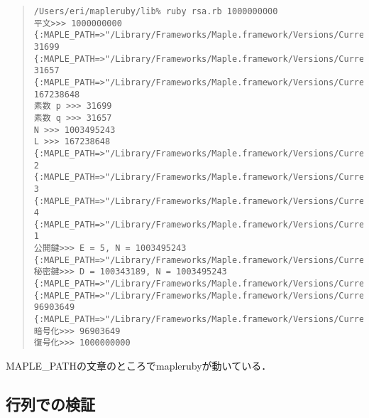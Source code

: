 \begin{quote}\begin{verbatim}
/Users/eri/mapleruby/lib% ruby rsa.rb 1000000000
平文>>> 1000000000
{:MAPLE_PATH=>"/Library/Frameworks/Maple.framework/Versions/Current/bin/maple"}
31699
{:MAPLE_PATH=>"/Library/Frameworks/Maple.framework/Versions/Current/bin/maple"}
31657
{:MAPLE_PATH=>"/Library/Frameworks/Maple.framework/Versions/Current/bin/maple"}
167238648
素数 p >>> 31699
素数 q >>> 31657
N >>> 1003495243
L >>> 167238648
{:MAPLE_PATH=>"/Library/Frameworks/Maple.framework/Versions/Current/bin/maple"}
2
{:MAPLE_PATH=>"/Library/Frameworks/Maple.framework/Versions/Current/bin/maple"}
3
{:MAPLE_PATH=>"/Library/Frameworks/Maple.framework/Versions/Current/bin/maple"}
4
{:MAPLE_PATH=>"/Library/Frameworks/Maple.framework/Versions/Current/bin/maple"}
1
公開鍵>>> E = 5, N = 1003495243
{:MAPLE_PATH=>"/Library/Frameworks/Maple.framework/Versions/Current/bin/maple"}
秘密鍵>>> D = 100343189, N = 1003495243
{:MAPLE_PATH=>"/Library/Frameworks/Maple.framework/Versions/Current/bin/maple"}
{:MAPLE_PATH=>"/Library/Frameworks/Maple.framework/Versions/Current/bin/maple"}
96903649
{:MAPLE_PATH=>"/Library/Frameworks/Maple.framework/Versions/Current/bin/maple"}
暗号化>>> 96903649
復号化>>> 1000000000
\end{verbatim}\end{quote}\begin{description}
\item[MAPLE\_PATHの文章のところでmaplerubyが動いている．
]\end{description}
\subsection{行列での検証}
